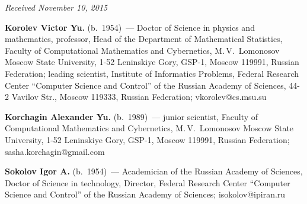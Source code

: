 \hfill{\small\textit{Received November 10, 2015}}

\Contr


\noindent
\textbf{Korolev Victor Yu.} (b.\ 1954)~---
Doctor of Science in physics and mathematics, professor, Head of the Department of 
Mathematical Statistics, Faculty of Computational Mathematics and Cybernetics, 
 M.\,V.~Lomonosov Moscow State University, 1-52 Leninskiye Gory, GSP-1, Moscow 119991, 
 Russian Federation; leading scientist, Institute of Informatics Problems, 
 Federal Research Center ``Computer Science and Control'' of the Russian Academy of 
 Sciences, 44-2 Vavilov Str., Moscow 119333,  Russian Federation; 
 vkorolev@cs.msu.su

\vspace*{3pt}

\noindent
\textbf{Korchagin Alexander Yu.} (b.\ 1989)~---
junior scientist, Faculty of Computational Mathematics and Cybernetics, 
M.\,V.~Lomonosov Moscow State University, 1-52 Leninskiye Gory, GSP-1, Moscow 119991, 
Russian Federation; sasha.korchagin@gmail.com


\vspace*{3pt}

\noindent
\textbf{Sokolov Igor A.} (b.\ 1954)~--- Academician of the Russian Academy of Sciences, 
Doctor of Science in technology, Director, Federal Research Center 
``Computer Science and Control'' of the Russian Academy of Sciences; 
isokolov@ipiran.ru

\label{end\stat}


\renewcommand{\bibname}{\protect\rm Литература}